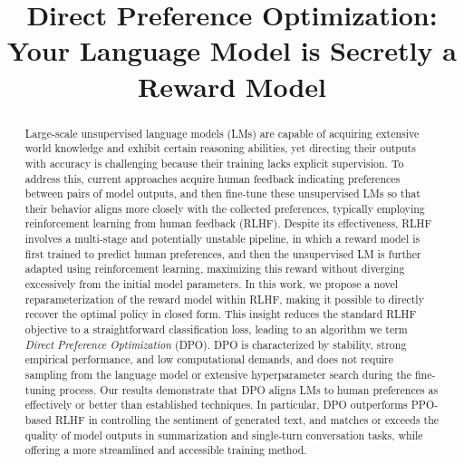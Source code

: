 \title{Direct Preference Optimization: Your Language Model is Secretly a Reward Model}

\begin{abstract}
Large-scale unsupervised language models (LMs) are capable of acquiring extensive world knowledge and exhibit certain reasoning abilities, yet directing their outputs with accuracy is challenging because their training lacks explicit supervision. To address this, current approaches acquire human feedback indicating preferences between pairs of model outputs, and then fine-tune these unsupervised LMs so that their behavior aligns more closely with the collected preferences, typically employing reinforcement learning from human feedback (RLHF). Despite its effectiveness, RLHF involves a multi-stage and potentially unstable pipeline, in which a reward model is first trained to predict human preferences, and then the unsupervised LM is further adapted using reinforcement learning, maximizing this reward without diverging excessively from the initial model parameters. In this work, we propose a novel reparameterization of the reward model within RLHF, making it possible to directly recover the optimal policy in closed form. This insight reduces the standard RLHF objective to a straightforward classification loss, leading to an algorithm we term \textit{Direct Preference Optimization} (DPO). DPO is characterized by stability, strong empirical performance, and low computational demands, and does not require sampling from the language model or extensive hyperparameter search during the fine-tuning process. Our results demonstrate that DPO aligns LMs to human preferences as effectively or better than established techniques. In particular, DPO outperforms PPO-based RLHF in controlling the sentiment of generated text, and matches or exceeds the quality of model outputs in summarization and single-turn conversation tasks, while offering a more streamlined and accessible training method.
\end{abstract}

